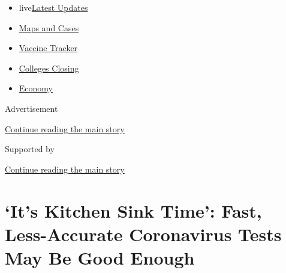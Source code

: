 \begin{itemize}
\tightlist
\item
  live\href{https://www.nytimes3xbfgragh.onion/2020/08/20/world/coronavirus-covid.html?name=styln-coronavirus-national\&region=TOP_BANNER\&variant=undefined\&block=storyline_menu_recirc\&action=click\&pgtype=Article\&impression_id=bdaebe11-e386-11ea-89f5-73e141fcc61b}{Latest
  Updates}
\item
  \href{https://www.nytimes3xbfgragh.onion/interactive/2020/us/coronavirus-us-cases.html?name=styln-coronavirus-national\&region=TOP_BANNER\&variant=undefined\&block=storyline_menu_recirc\&action=click\&pgtype=Article\&impression_id=bdaebe12-e386-11ea-89f5-73e141fcc61b}{Maps
  and Cases}
\item
  \href{https://www.nytimes3xbfgragh.onion/interactive/2020/science/coronavirus-vaccine-tracker.html?name=styln-coronavirus-national\&region=TOP_BANNER\&variant=undefined\&block=storyline_menu_recirc\&action=click\&pgtype=Article\&impression_id=bdaebe13-e386-11ea-89f5-73e141fcc61b}{Vaccine
  Tracker}
\item
  \href{https://www.nytimes3xbfgragh.onion/2020/08/19/us/colleges-closing-covid.html?name=styln-coronavirus-national\&region=TOP_BANNER\&variant=undefined\&block=storyline_menu_recirc\&action=click\&pgtype=Article\&impression_id=bdaebe14-e386-11ea-89f5-73e141fcc61b}{Colleges
  Closing}
\item
  \href{https://www.nytimes3xbfgragh.onion/live/2020/08/20/business/stock-market-today-coronavirus?name=styln-coronavirus-national\&region=TOP_BANNER\&variant=undefined\&block=storyline_menu_recirc\&action=click\&pgtype=Article\&impression_id=bdaee520-e386-11ea-89f5-73e141fcc61b}{Economy}
\end{itemize}

Advertisement

\protect\hyperlink{after-top}{Continue reading the main story}

Supported by

\protect\hyperlink{after-sponsor}{Continue reading the main story}

\hypertarget{its-kitchen-sink-time-fast-less-accurate-coronavirus-tests-may-be-good-enough}{%
\section{`It's Kitchen Sink Time': Fast, Less-Accurate Coronavirus Tests
May Be Good
Enough}\label{its-kitchen-sink-time-fast-less-accurate-coronavirus-tests-may-be-good-enough}}

